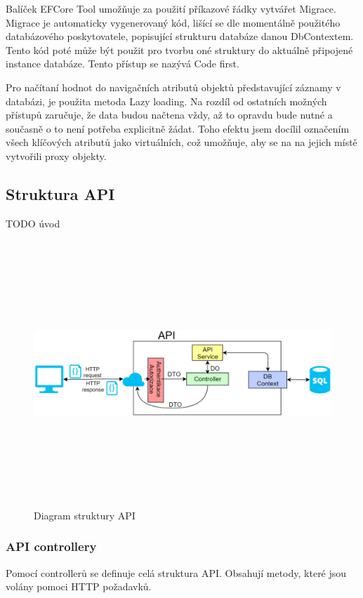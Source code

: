 \documentclass[
  biblatex,
  glossaries,
  index
]{kidiplom}
\begin{document}
Balíček EFCore Tool umožňuje za použití příkazové řádky vytvářet Migrace. Migrace je automaticky vygenerovaný kód, lišící se dle momentálně použitého databázového poskytovatele, popisující strukturu databáze danou DbContextem. Tento kód poté může být použit pro tvorbu oné struktury do aktuálně připojené instance databáze. Tento přístup se nazývá Code first.

Pro načítaní hodnot do navigačních atributů objektů představující záznamy v databázi, je použita metoda Lazy loading. Na rozdíl od ostatních možných přístupů zaručuje, že data budou načtena vždy, až to opravdu bude nutné a současně o to není potřeba explicitně žádat. Toho efektu jsem docílil označením všech klíčových atributů jako virtuálních, což umožňuje, aby se na na jejich místě vytvořili proxy objekty.

\subsection{Struktura API}
TODO úvod
\begin{figure}[H]
  	\centering
 	 \includegraphics[width=14cm,height=10cm,keepaspectratio]{API_Diagram}
 	 \caption{Diagram struktury API}
 	 \label{fig:ApiStructure}
\end{figure}

\subsubsection{API controllery}
Pomocí controllerů se definuje celá struktura API. Obsahují metody, které jsou volány pomoci HTTP požadavků. 
\end{document}
